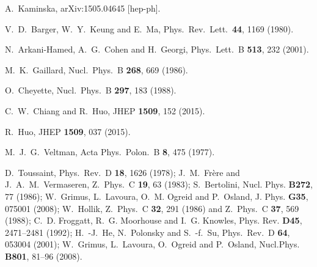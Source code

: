   A.~Kaminska,
  arXiv:1505.04645 [hep-ph].

  V.~D.~Barger, W.~Y.~Keung and E.~Ma,
  Phys.\ Rev.\ Lett.\  {\bf 44}, 1169 (1980).

  N.~Arkani-Hamed, A.~G.~Cohen and H.~Georgi,
  Phys.\ Lett.\ B {\bf 513}, 232 (2001).
  
  M.~K.~Gaillard,
  Nucl.\ Phys.\ B {\bf 268}, 669 (1986).

  O.~Cheyette,
  Nucl.\ Phys.\ B {\bf 297}, 183 (1988).

  C.~W.~Chiang and R.~Huo,
  JHEP {\bf 1509}, 152 (2015).  

  R.~Huo,
  JHEP {\bf 1509}, 037 (2015).

  M.~J.~G.~Veltman,
  Acta Phys.\ Polon.\ B {\bf 8}, 475 (1977).
  
  D.~Toussaint,
  Phys.\ Rev.\ D {\bf 18}, 1626 (1978);
  J.~M.~Fr\`ere and J.~A.~M.~Vermaseren,
  Z.\ Phys.\ C {\bf 19}, 63 (1983);
  S.~Bertolini,
  Nucl. Phys. \textbf{ B272}, 77 (1986);
  W.~Grimus, L.~Lavoura, O.~M. Ogreid and P.~Osland,
  J. Phys. \textbf{ G35}, 075001 (2008);
  W.~Hollik,
  Z.\ Phys.\ C {\bf 32}, 291 (1986) 
  and
  Z.\ Phys.\ C {\bf 37}, 569 (1988);
  C.~D. Froggatt, R.~G. Moorhouse and I.~G. Knowles,
  Phys. Rev. \textbf{ D45}, 2471--2481 (1992);
  H.~-J.~He, N.~Polonsky and S.~-f.~Su,
  Phys.\ Rev.\ D {\bf 64}, 053004 (2001);
  W.~Grimus, L.~Lavoura, O.~Ogreid and P.~Osland,
  Nucl.Phys. \textbf{ B801}, 81--96 (2008).

